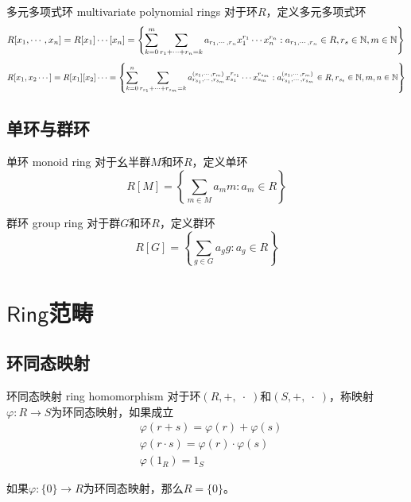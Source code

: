 \begin{definition}{多元多项式环 multivariate polynomial rings}
	对于环$R$，定义多元多项式环
	$$
	R[x_1,\cdots,x_n]
	=R[x_1]\cdots[x_n]
	=\left\{ \sum_{k=0}^{m}\sum_{r_1+\cdots+r_n=k}a_{r_1,\cdots,r_n}x_1^{r_1}\cdots x_n^{r_n}:a_{r_1,\cdots,r_n}\in R,r_s\in \mathbb{N},m\in\mathbb{N} \right\}\\
	$$
	$$
	R[x_1,x_2\cdots]=R[x_1][x_2]\cdots=\left\{ \sum_{k=0}^{n}\sum_{r_{s_1}+\cdots+r_{s_m}=k}a^{(s_1,\cdots,r_m)}_{r_{s_1},\cdots,r_{s_m}}x_{s_1}^{r_{s_1}}\cdots x_{s_m}^{r_{s_m}}:a^{(s_1,\cdots,r_m)}_{r_{s_1},\cdots,r_{s_m}}\in R,r_{s_t}\in\mathbb{N},m,n\in\mathbb{N} \right\}
	$$
\end{definition}

\subsection{单环与群环}

\begin{definition}{单环 monoid ring}
	对于幺半群$M$和环$R$，定义单环
	$$
	R[M]=\left\{ \sum_{m\in M}a_mm:a_m\in R \right\}
	$$
\end{definition}

\begin{definition}{群环 group ring}
	对于群$G$和环$R$，定义群环
	$$
	R[G]=\left\{ \sum_{g\in G}a_gg:a_g\in R \right\}
	$$
\end{definition}

\section{$\mathsf{Ring}$范畴}

\subsection{环同态映射}

\begin{definition}{环同态映射 ring homomorphism}
	对于环$(R,+,\;\cdot\;)$和$(S,+,\;\cdot\;)$，称映射$\varphi:R\to S$为环同态映射，如果成立
	\begin{align*}
		&\varphi(r+s)=\varphi(r)+\varphi(s)\\
		&\varphi(r\cdot s)=\varphi(r)\cdot\varphi(s)\\
		&\varphi(1_R)=1_S
	\end{align*}
\end{definition}

\begin{proposition}
	如果$\varphi:\{0\}\to R$为环同态映射，那么$R=\{0\}$。
\end{proposition}

